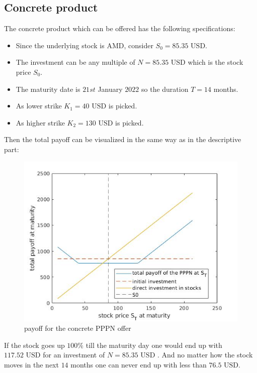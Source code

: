 \documentclass[11pt,oneside,a4paper]{article}
\begin{document}
	\subsection{Concrete product}
	The concrete product which can be offered has the following specifications:
	\begin{itemize}
		\item Since the underlying stock is AMD, consider $ S_0 = 85.35 \text{ USD} $.
		\item The investment can be any multiple of $ N = 85.35 \text{ USD} $ which is the stock price $ S_0 $.
		\item The maturity date is $ 21st $ January $ 2022 $ so the duration $ T = 14 $ months.
		\item As lower strike $ K_1 = 40 \text{ USD} $ is picked.
		\item As higher strike $ K_2 = 130 \text{ USD} $ is picked.
	\end{itemize}
	Then the total payoff can be visualized in the same way as in the descriptive part:
	\begin{figure}[H]
		\centering
		\includegraphics[width=0.8\linewidth]{PPPN_concrete.jpg}
		\caption{payoff for the concrete PPPN offer}
	\end{figure} 
	If the stock goes up $ 100 \% $ till the maturity day one would end up with $ 117.52 \text{ USD}$ for an investment of  $ N = 85.35 \text{ USD} $ . And no matter how the stock moves in the next $ 14 $ months one can never end up with less than $ 76.5 \text{ USD} $.
	\newpage
\end{document}
